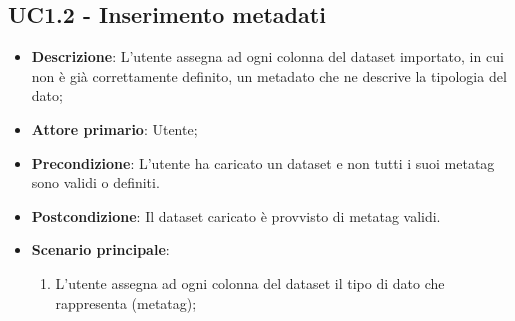 \subsection{UC1.2 - Inserimento metadati}
\begin{itemize}
    \item \textbf{Descrizione}: L'utente assegna ad ogni colonna del dataset importato,
                                in cui non è già correttamente definito,
                                un metadato che ne descrive la tipologia del dato;


    \item \textbf{Attore primario}: Utente;
    
    \item \textbf{Precondizione}:   L'utente ha caricato un dataset e non tutti i suoi 
                                    metatag sono validi o definiti.

    \item \textbf{Postcondizione}:  Il dataset caricato è provvisto di metatag validi. 

	\item \textbf{Scenario principale}:
		\begin{enumerate}
			\item L'utente assegna ad ogni colonna del dataset il tipo di dato che rappresenta (metatag);
        \end{enumerate}

\end{itemize}


